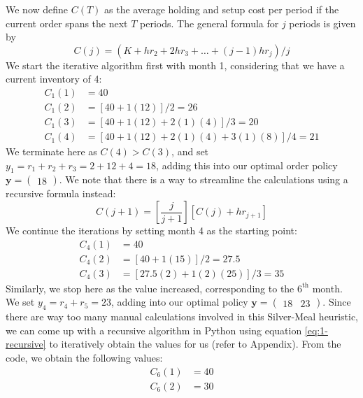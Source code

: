 \documentclass[12pt]{article}
\begin{document}
\noindent We now define $C(T)$ as the average holding and setup cost per period if the current order spans the next $T$ periods. The general formula for $j$ periods is given by \begin{equation}
    C(j) = (K + hr_2 + 2hr_3 + \dots + (j-1)hr_j) / j 
\end{equation} We start the iterative algorithm first with month 1, considering that we have a current inventory of 4: \begin{align*}
    C_1(1) &= 40 \\ 
    C_1(2) &= \left[ 40 + 1(12)\right] / 2 = 26 \\ 
    C_1(3) &= \left[ 40 + 1(12) + 2(1)(4) \right] / 3 = 20 \\ 
    C_1(4) &= \left[ 40 + 1(12) + 2(1)(4) + 3(1)(8) \right] / 4 = 21 
\end{align*} We terminate here as $C(4) > C(3)$, and set $y_{1} = r_{1} + r_{2} + r_{3} = 2 + 12 + 4 = 18$, adding this into our optimal order policy $\mathbf{y} = \begin{pmatrix}
    18
\end{pmatrix}$. We note that there is a way to streamline the calculations using a recursive formula instead: \begin{equation}\label{eq:1-recursive}
    C(j+1) =\left[ \frac{j}{j+1} \right]\left[ C(j) + hr_{j+1} \right]
\end{equation} We continue the iterations by setting month 4 as the starting point: \begin{align*}
    C_{4}(1) &= 40 \\ 
    C_{4}(2) &= \left[ 40 + 1(15) \right] / 2 = 27.5 \\ 
    C_{4}(3) &= \left[ 27.5(2) + 1(2)(25)\right] / 3 = 35
\end{align*} Similarly, we stop here as the value increased, corresponding to the $6^{\text{th}}$ month. We set $y_{4} = r_{4} + r_{5} = 23$, adding into our optimal policy $\mathbf{y} = \begin{pmatrix}
    18 & 23 
\end{pmatrix}$. Since there are way too many manual calculations involved in this Silver-Meal heuristic, we can come up with a recursive algorithm in Python using equation \ref{eq:1-recursive} to iteratively obtain the values for us (refer to Appendix). From the code, we obtain the following values: \begin{align*}
    C_{6}(1) &= 40 \\ 
    C_{6}(2) &= 30 \\ 

\end{align*}
\end{document}

